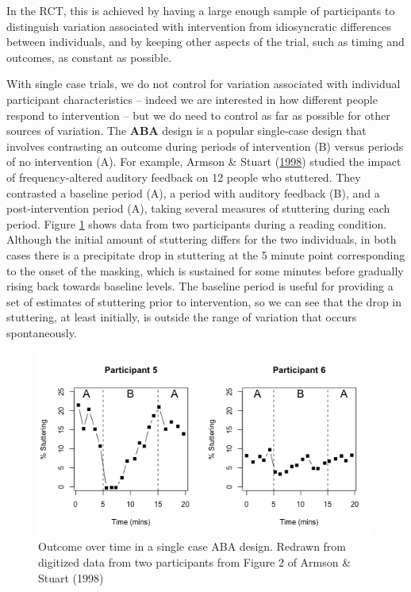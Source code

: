 \documentclass{krantz}
\begin{document}
In the RCT, this is achieved by having a large enough sample of participants to distinguish variation associated with intervention from idiosyncratic differences between individuals, and by keeping other aspects of the trial, such as timing and outcomes, as constant as possible.

With single case trials, we do not control for variation associated with individual participant characteristics -- indeed we are interested in how different people respond to intervention -- but we do need to control as far as possible for other sources of variation. The \textbf{ABA} design is a popular single-case design that involves contrasting an outcome during periods of intervention (B) versus periods of no intervention (A). For example, Armson \& Stuart (\protect\hyperlink{ref-armson1998}{1998}) studied the impact of frequency-altered auditory feedback on 12 people who stuttered. They contrasted a baseline period (A), a period with auditory feedback (B), and a post-intervention period (A), taking several measures of stuttering during each period. Figure \ref{fig:SingleCaseDplot} shows data from two participants during a reading condition. Although the initial amount of stuttering differs for the two individuals, in both cases there is a precipitate drop in stuttering at the 5 minute point corresponding to the onset of the masking, which is sustained for some minutes before gradually rising back towards baseline levels. The baseline period is useful for providing a set of estimates of stuttering prior to intervention, so we can see that the drop in stuttering, at least initially, is outside the range of variation that occurs spontaneously.

\begin{figure}
\includegraphics[width=0.85\linewidth]{images_bw/SingleCaseDplot} \caption{Outcome over time in a single case ABA design. Redrawn from digitized data from two participants from Figure 2 of Armson \& Stuart (1998)}\label{fig:SingleCaseDplot}
\end{figure}
\end{document}
